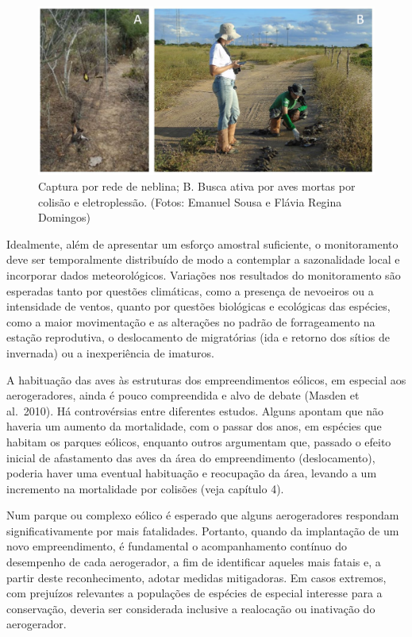 \documentclass[
  oneside]{scrbook}
\begin{document}
\begin{figure}[H]

{\centering \includegraphics[width=0.75\linewidth]{imagens/cap06/Figura_6.3ab} 

}

\caption{Captura por rede de neblina; B. Busca ativa por aves mortas por colisão e eletroplessão. (Fotos: Emanuel Sousa e Flávia Regina Domingos)}\label{fig:20}
\end{figure}

Idealmente, além de apresentar um esforço amostral suficiente, o monitoramento deve ser temporalmente distribuído de modo a contemplar a sazonalidade local e incorporar dados meteorológicos. Variações nos resultados do monitoramento são esperadas tanto por questões climáticas, como a presença de nevoeiros ou a intensidade de ventos, quanto por questões biológicas e ecológicas das espécies, como a maior movimentação e as alterações no padrão de forrageamento na estação reprodutiva, o deslocamento de migratórias (ida e retorno dos sítios de invernada) ou a inexperiência de imaturos.

A habituação das aves às estruturas dos empreendimentos eólicos, em especial aos aerogeradores, ainda é pouco compreendida e alvo de debate (Masden et al.~2010). Há controvérsias entre diferentes estudos. Alguns apontam que não haveria um aumento da mortalidade, com o passar dos anos, em espécies que habitam os parques eólicos, enquanto outros argumentam que, passado o efeito inicial de afastamento das aves da área do empreendimento (deslocamento), poderia haver uma eventual habituação e reocupação da área, levando a um incremento na mortalidade por colisões (veja capítulo 4).

Num parque ou complexo eólico é esperado que alguns aerogeradores respondam significativamente por mais fatalidades. Portanto, quando da implantação de um novo empreendimento, é fundamental o acompanhamento contínuo do desempenho de cada aerogerador, a fim de identificar aqueles mais fatais e, a partir deste reconhecimento, adotar medidas mitigadoras. Em casos extremos, com prejuízos relevantes a populações de espécies de especial interesse para a conservação, deveria ser considerada inclusive a realocação ou inativação do aerogerador.
\end{document}

